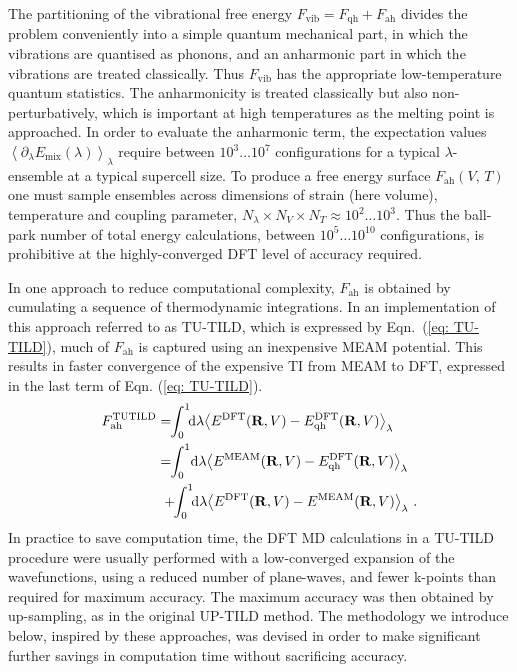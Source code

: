 \documentclass[twocolumn,american,aps,prb,showpacs,showkeys,amsmath,amssymb,superscriptaddress,a4]{revtex4-1}
\newcommand {\dd} {\text{d}}
\begin{document}
The partitioning of the vibrational free energy $F_{\text{vib}}=F_{\text{qh}}+F_{\text{ah}}$ divides
the problem conveniently into a simple quantum mechanical part, in which the vibrations are quantised as phonons, and an anharmonic part in which the vibrations are treated classically.  Thus $F_{\text{vib}}$  has the appropriate low-temperature quantum
statistics. The anharmonicity is treated
classically but also non-perturbatively, which is important at high
temperatures as the melting point is approached. In order to evaluate the anharmonic term,
the expectation values $\left\langle \partial_{\lambda}E_{\text{mix}}(\lambda)\right\rangle _{\lambda}$
require  between $10^3 \ldots 10^7$ configurations for a typical $\lambda$-ensemble
at a typical supercell size. To produce a free energy surface $F_{\text{ah}}(V,\,T)$
one must sample ensembles across dimensions of strain (here volume),
temperature and coupling parameter, $N_{\lambda}\times N_{V}\times N_{T}\approx10^2 \ldots 10^3$.
Thus the ball-park number of total energy calculations, between $10^5 \ldots 10^{10}$
configurations, is prohibitive at the highly-converged DFT level of
accuracy required.

In one approach to reduce computational complexity, $F_{\text{ah}}$
is obtained by cumulating a sequence of thermodynamic integrations. In an implementation
of this approach referred to as TU-TILD,\cite{Duff2015} which is expressed by Eqn.~(\ref{eq: TU-TILD}), much of $F_{\text{ah}}$
is captured using an inexpensive MEAM potential. This results in faster convergence of the expensive TI from
MEAM to DFT, expressed in the last term of Eqn. (\ref{eq: TU-TILD}).
\begin{align}
F_{\text{ah}}^{\text{TUTILD}} & =\!\!\int_{0}^{1}\!\!\dd\lambda\!\left\langle E^{\text{DFT}}(\mathbf{R},V)-E_{\text{qh}}^{\text{DFT}}(\mathbf{R},V)\right\rangle _{\lambda}\nonumber \\
 & =\!\!\int_{0}^{1}\!\dd\lambda\!\left\langle E^{\text{MEAM}}(\mathbf{R},V)-E_{\text{qh}}^{\text{DFT}}(\mathbf{R},V)\right\rangle _{\lambda}\notag\\
 &\,\,+\!\!\int_{0}^{1}\!\!\dd\lambda\!\left\langle E^{\text{DFT}}(\mathbf{R},V)-E^{\text{MEAM}}(\mathbf{R},V)\right\rangle _{\lambda}\,.
 \label{eq: TU-TILD}
\end{align}
In practice to save computation time, the DFT MD calculations in a TU-TILD procedure were usually performed with a low-converged expansion of the wavefunctions, using a reduced number of plane-waves, and fewer k-points than required for maximum accuracy.  The maximum accuracy was then obtained by up-sampling, as in the original UP-TILD method\cite{Grabowski2009}.  
The methodology we introduce below, inspired by these approaches, was devised in order to make significant further savings in computation time without sacrificing accuracy.
\end{document}
